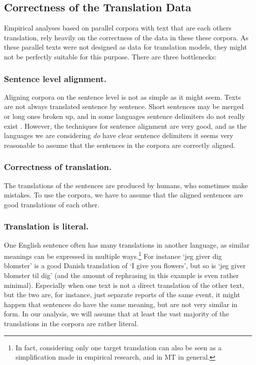 \documentclass{report}
\begin{document}
\subsection{Correctness of the Translation Data}

Empirical analyses based on parallel corpora with text that are each others translation, rely heavily on the correctness of the data in these these corpora. As these parallel texts were not designed as data for translation models, they might not be perfectly suitable for this purpose. There are three bottlenecks:

\subsubsection{Sentence level alignment.}
Aligning corpora on the sentence level is not as simple as it might seem. Texts are not always translated sentence by sentence. Short sentences may be merged or long ones broken up, and in some languages sentence delimiters do not really exist \citep[p.55]{koehn2008statistical}. However, the techniques for sentence alignment are very good, and as the languages we are considering \textit{do} have clear sentence delimiters it seems very reasonable to assume that the sentences in the corpora are correctly aligned.

\subsubsection{Correctness of translation.}
The translations of the sentences are produced by humans, who sometimes make mistakes. To use the corpora, we have to assume that the aligned sentences are good translations of each other.

\subsubsection{Translation is literal.}
One English sentence often has many translations in another language, as similar meanings can be expressed in multiple ways.\footnote{In fact, considering only one target translation can also be seen as a simplification made in empirical research, and in MT in general.} For instance `jeg giver dig blomster' is a good Danish translation of `I give you flowers', but so is `jeg giver blomster til dig' (and the amount of rephrasing in this example is even rather minimal). Especially when one text is not a direct translation of the other text, but the two are, for instance, just separate reports of the same event, it might happen that sentences do have the same meaning, but are not very similar in form. In our analysis, we will assume that at least the vast majority of the translations in the corpora are rather literal.
 
\end{document}
